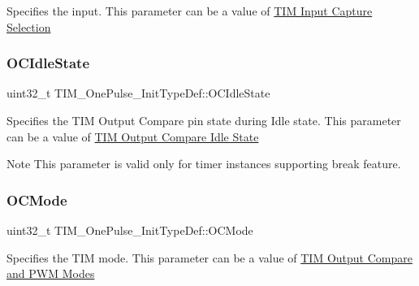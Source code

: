 Specifies the input. This parameter can be a value of \hyperlink{group___t_i_m___input___capture___selection}{T\+IM Input Capture Selection} \mbox{\label{struct_t_i_m___one_pulse___init_type_def_aef11bcea1dbf3e3ddf2a4bbc2846bb1e}} 
\subsubsection{\texorpdfstring{O\+C\+Idle\+State}{OCIdleState}}
{\footnotesize\ttfamily uint32\+\_\+t T\+I\+M\+\_\+\+One\+Pulse\+\_\+\+Init\+Type\+Def\+::\+O\+C\+Idle\+State}

Specifies the T\+IM Output Compare pin state during Idle state. This parameter can be a value of \hyperlink{group___t_i_m___output___compare___idle___state}{T\+IM Output Compare Idle State} \begin{DoxyNote}{Note}
This parameter is valid only for timer instances supporting break feature. 
\end{DoxyNote}
\mbox{\label{struct_t_i_m___one_pulse___init_type_def_af127f01162853e39ae616b43cc52b674}} 
\subsubsection{\texorpdfstring{O\+C\+Mode}{OCMode}}
{\footnotesize\ttfamily uint32\+\_\+t T\+I\+M\+\_\+\+One\+Pulse\+\_\+\+Init\+Type\+Def\+::\+O\+C\+Mode}

Specifies the T\+IM mode. This parameter can be a value of \hyperlink{group___t_i_m___output___compare__and___p_w_m__modes}{T\+IM Output Compare and P\+WM Modes} \mbox{\label{struct_t_i_m___one_pulse___init_type_def_a37bc0a680d53458bf4c42ebb277b0c2c}} 
